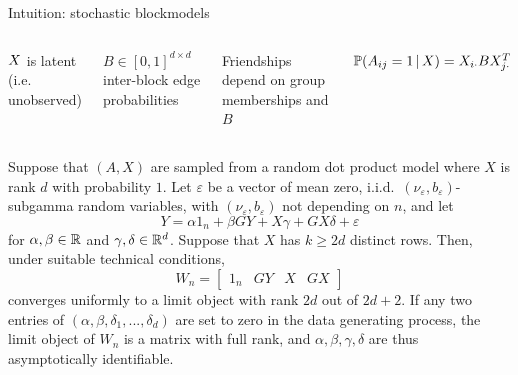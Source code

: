 \documentclass[aspectratio=169]{beamer}
\theoremstyle{remark}
\begin{document}
\begin{frame}{Intuition: stochastic blockmodels}
\begin{columns}
        \vspace{4mm}
        
        $X$ is latent (i.e. unobserved)
        
        \vspace{4mm}
        
        $B \in [0, 1]^{d \times d}$ inter-block edge probabilities
        
        \vspace{4mm}
        
        Friendships depend on group memberships and $B$
        
        $\P[\X]{A_{ij} = 1} = \X_{i \cdot} B \X_{j \cdot}^T$
        
    \end{columns}
    
\end{frame}




\begin{frame}

    \begin{theorem} \label{thm:rdpg}
        Suppose that $(A, X)$ are sampled from a random dot product model where $X$ is rank $d$ with probability $1$.
        Let $\varepsilon$ be a vector of mean zero, i.i.d.~$(\nu_\varepsilon, b_\varepsilon)$-subgamma random variables, with $(\nu_\varepsilon, b_\varepsilon)$ not depending on $n$,
        and let
        \begin{equation}
            Y = \alpha 1_n + \beta G Y + X \gamma + G X \delta + \varepsilon
        \end{equation}
        for $\alpha, \beta \in \mathbb{R}$ and $\gamma, \delta \in \mathbb{R}^d$. Suppose that $X$ has $k \ge 2d$ distinct rows. Then, under suitable technical conditions,
        \begin{equation*}
            W_n = \begin{bmatrix}
                1_n & GY & X & GX
            \end{bmatrix}
        \end{equation*}
        converges uniformly to a limit object with rank $2d$ out of $2d + 2$. If any two entries of $(\alpha, \beta, \delta_1, ..., \delta_d)$ are set to zero in the data generating process, the limit object of $W_n$ is a matrix with full rank, and $\alpha, \beta, \gamma, \delta$ are thus asymptotically identifiable.
    \end{theorem}
\end{frame}
\end{document}
